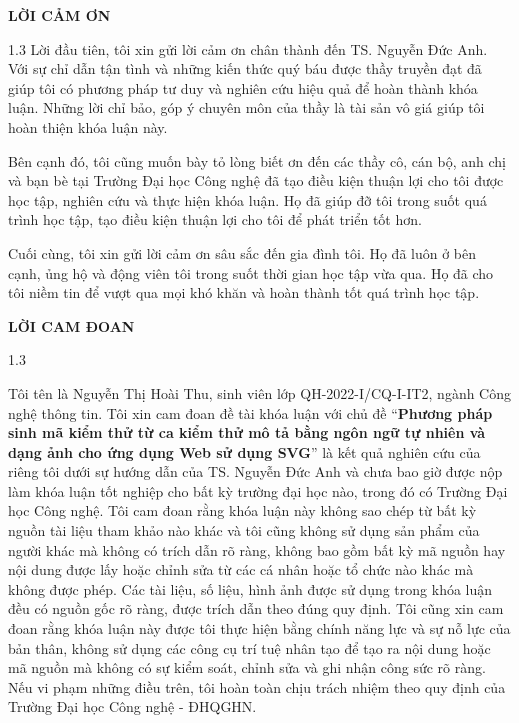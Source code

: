\documentclass[a4paper, 12pt]{report}
\begin{document}
\newpage
{}
\begin{center}
    {\fontsize{14pt}{16pt}\selectfont \textbf{LỜI CẢM ƠN}}
\end{center}

\begin{spacing}{1.3}
Lời đầu tiên, tôi xin gửi lời cảm ơn chân thành đến TS. Nguyễn Đức Anh. Với sự chỉ dẫn tận tình và những kiến thức quý báu được thầy truyền đạt đã giúp tôi có phương pháp tư duy và nghiên cứu hiệu quả để hoàn thành khóa luận. Những lời chỉ bảo, góp ý chuyên môn của thầy là tài sản vô giá giúp tôi hoàn thiện khóa luận này.


Bên cạnh đó, tôi cũng muốn bày tỏ lòng biết ơn đến các thầy cô, cán bộ, anh chị và
bạn bè tại Trường Đại học Công nghệ đã tạo điều kiện thuận lợi cho tôi được học tập,
nghiên cứu và thực hiện khóa luận. Họ đã giúp đỡ tôi trong suốt quá trình học tập, tạo
điều kiện thuận lợi cho tôi để phát triển tốt hơn.


Cuối cùng, tôi xin gửi lời cảm ơn sâu sắc đến gia đình tôi. Họ đã luôn ở bên cạnh, ủng
hộ và động viên tôi trong suốt thời gian học tập vừa qua. Họ đã cho tôi niềm tin để vượt
qua mọi khó khăn và hoàn thành tốt quá trình học tập.

\end{spacing}

\newpage





\begin{center}
    {\fontsize{14pt}{16pt}\selectfont \textbf{LỜI CAM ĐOAN}}
\end{center}

\begin{spacing}{1.3}
\end{spacing}
Tôi tên là Nguyễn Thị Hoài Thu, sinh viên lớp 	QH-2022-I/CQ-I-IT2, ngành Công nghệ thông tin. Tôi xin cam đoan đề tài khóa luận với chủ đề 
“\textbf{Phương pháp sinh mã kiểm thử từ ca kiểm thử mô tả bằng ngôn ngữ tự nhiên và dạng ảnh cho ứng dụng Web sử dụng SVG}” là kết quả nghiên cứu của riêng tôi dưới sự hướng dẫn của TS. Nguyễn Đức Anh và chưa bao giờ được nộp làm khóa luận tốt nghiệp cho bất kỳ trường đại học nào, trong đó có Trường Đại học Công nghệ. Tôi cam đoan rằng khóa luận này không sao chép từ bất kỳ nguồn tài liệu tham khảo nào khác và tôi cũng không sử dụng sản phẩm của người khác mà không có trích dẫn rõ ràng, không bao gồm bất kỳ mã nguồn hay nội dung được lấy hoặc chỉnh sửa từ các cá nhân hoặc tổ chức nào khác mà không được phép. Các tài liệu, số liệu, hình ảnh được sử dụng trong khóa luận đều có nguồn gốc rõ ràng, 
được trích dẫn theo đúng quy định. Tôi cũng xin cam đoan rằng khóa luận này được tôi thực hiện bằng chính năng lực và sự nỗ lực của bản thân, không sử dụng các công cụ trí tuệ nhân tạo để tạo ra nội dung hoặc mã nguồn mà không có sự kiểm soát, chỉnh sửa và ghi nhận công sức rõ ràng. 
Nếu vi phạm những điều trên, tôi hoàn toàn chịu trách nhiệm theo quy định của Trường Đại học Công nghệ - ĐHQGHN.  
\end{document}
